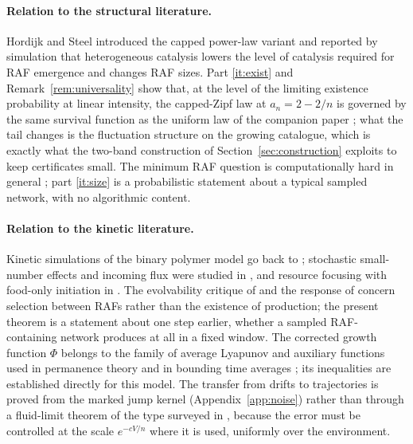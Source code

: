 \documentclass[11pt,letterpaper]{article}
\theoremstyle{plain}
\theoremstyle{definition}
\theoremstyle{remark}
\numberwithin{equation}{section}
\begin{document}
\paragraph{Relation to the structural literature.}
Hordijk and Steel \cite{hordijk2016variable} introduced the capped power-law variant and reported by simulation that heterogeneous catalysis lowers the level of catalysis required for RAF emergence and changes RAF sizes. Part \ref{it:exist} and Remark~\ref{rem:universality} show that, at the level of the limiting existence probability at linear intensity, the capped-Zipf law at $a_n=2-2/n$ is governed by the same survival function as the uniform law of the companion paper \cite{criticalwindow2026}; what the tail changes is the fluctuation structure on the growing catalogue, which is exactly what the two-band construction of Section~\ref{sec:construction} exploits to keep certificates small. The minimum RAF question is computationally hard in general \cite{steel2019autocatalytic}; part \ref{it:size} is a probabilistic statement about a typical sampled network, with no algorithmic content.

\paragraph{Relation to the kinetic literature.}
Kinetic simulations of the binary polymer model go back to \cite{farmer1986autocatalytic}; stochastic small-number effects and incoming flux were studied in \cite{filisetti2011stochastic}, and resource focusing with food-only initiation in \cite{giri2012origin}. The evolvability critique of \cite{vasas2010lack} and the response of \cite{hordijk2014evolvability} concern selection between RAFs rather than the existence of production; the present theorem is a statement about one step earlier, whether a sampled RAF-containing network produces at all in a fixed window. The corrected growth function $\Phi$ belongs to the family of average Lyapunov and auxiliary functions used in permanence theory \cite{patel2018robust} and in bounding time averages \cite{tobasco2018optimal}; its inequalities are established directly for this model. The transfer from drifts to trajectories is proved from the marked jump kernel (Appendix~\ref{app:noise}) rather than through a fluid-limit theorem of the type surveyed in \cite{darling2008differential}, because the error must be controlled at the scale $e^{-cV/n}$ where it is used, uniformly over the environment.
\end{document}
